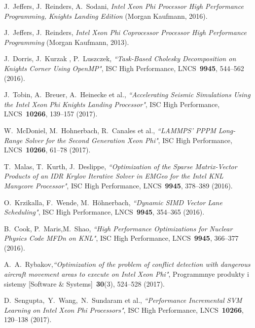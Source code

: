 \documentclass[
11pt,%
tightenlines,%
twoside,%
onecolumn,%
nofloats,%
nobibnotes,%
nofootinbib,%
superscriptaddress,%
noshowpacs,%
centertags]%
{revtex4}
\begin{document}
\begin{thebibliography}{99}

J.~Jeffers, J.~Reinders, A.~Sodani, \emph{Intel Xeon Phi Processor High Performance Programming, Knights Landing Edition} (Morgan Kaufmann, 2016).

J.~Jeffers, J.~Reinders, \emph{Intel Xeon Phi Coprocessor Processor High Performance Programming} (Morgan Kaufmann, 2013).

J.~Dorris, J.~Kurzak , P.~Luszczek, {\it ``Task-Based Cholesky Decomposition on Knights Corner Using OpenMP"}, ISC High Performance, LNCS~{\bf 9945}, 544--562 (2016).

J.~Tobin, A.~Breuer, A.~Heinecke et al., {\it ``Accelerating Seismic Simulations Using the Intel Xeon Phi Knights Landing Processor"}, ISC High Performance, LNCS~{\bf 10266}, 139--157 (2017).

W.~McDoniel, M.~Hohnerbach, R.~Canales et al., {\it ``LAMMPS' PPPM Long-Range Solver for the Second Generation Xeon Phi"}, ISC High Performance, LNCS~{\bf 10266}, 61--78 (2017).

T.~Malas, T.~Kurth, J.~Deslippe, {\it ``Optimization of the Sparse Matrix-Vector Products of an IDR Krylov Iterative Solver in EMGeo for the Intel KNL Manycore Processor"}, ISC High Performance, LNCS~{\bf 9945}, 378--389 (2016).

O.~Krzikalla, F.~Wende, M.~H\"ohnerbach, {\it ``Dynamic SIMD Vector Lane Scheduling"}, ISC High Performance, LNCS~{\bf 9945}, 354--365 (2016).

B.~Cook, P.~Maris,M.~Shao, {\it ``High Performance Optimizations for Nuclear Physics Code MFDn on KNL"}, ISC High Performance, LNCS~{\bf 9945}, 366--377 (2016).

A.~A.~Rybakov,{\it ``Optimization of the problem of conflict detection with dangerous aircraft movement areas to execute on Intel Xeon Phi"}, Programmnye produkty i sistemy [Software \& Systems]~{\bf 30}(3), 524--528 (2017).

D.~Sengupta,~Y.~Wang,~N.~Sundaram et al., {\it ``Performance Incremental SVM Learning on Intel Xeon Phi Processors"}, ISC High Performance, LNCS~{\bf 10266}, 120--138 (2017).


\end{thebibliography}
\end{document}
